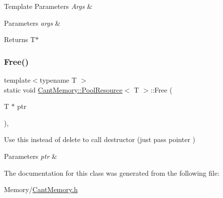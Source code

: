 \begin{DoxyTemplParams}{Template Parameters}
{\em Args} & \\
\hline
\end{DoxyTemplParams}

\begin{DoxyParams}{Parameters}
{\em args} & \\
\hline
\end{DoxyParams}
\begin{DoxyReturn}{Returns}
T$\ast$ 
\end{DoxyReturn}
\mbox{\label{classCantMemory_1_1PoolResource_a05b89531f1d82d128d6964899ba94538}} 
\subsubsection{\texorpdfstring{Free()}{Free()}}
{\footnotesize\ttfamily template$<$typename T $>$ \\
static void \hyperlink{classCantMemory_1_1PoolResource}{Cant\+Memory\+::\+Pool\+Resource}$<$ T $>$\+::Free (\begin{DoxyParamCaption}\item[{T $\ast$}]{ptr }\end{DoxyParamCaption})\hspace{0.3cm}{\ttfamily [inline]}, {\ttfamily [static]}}



Use this instead of delete to call destructor (just pass pointer ) 


\begin{DoxyParams}{Parameters}
{\em ptr} & \\
\hline
\end{DoxyParams}


The documentation for this class was generated from the following file\+:\begin{DoxyCompactItemize}
\item 
Memory/\hyperlink{CantMemory_8h}{Cant\+Memory.\+h}\end{DoxyCompactItemize}
